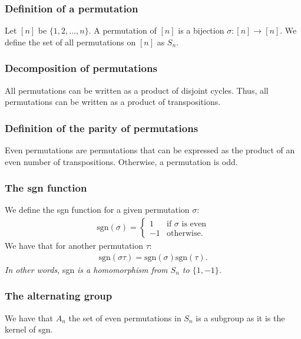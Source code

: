 \documentclass[a4paper, 12pt, twoside]{article}
\begin{document}
\subsubsection{Definition of a permutation}

Let $[n]$ be $\{1, 2, \ldots, n\}$. A permutation of $[n]$ is a bijection
$\sigma : [n] \to [n]$. We define the set of all permutations on $[n]$ as
$S_n$.

\subsubsection{Decomposition of permutations}

All permutations can be written as a product of disjoint cycles. Thus,
all permutations can be written as a product of transpositions.

\subsubsection{Definition of the parity of permutations}

Even permutations are permutations that can be expressed as the
product of an even number of transpositions. Otherwise, a
permutation is odd. 

\subsubsection{The sgn function}

We define the sgn function for a given
permutation $\sigma$: \begin{gather*}
  \text{sgn}(\sigma) = \begin{cases}
    1 & \text{if } \sigma \text{ is even} \\
    -1 & \text{otherwise.}
  \end{cases}
\end{gather*} We have that for another permutation $\tau$: \begin{gather*}
  \text{sgn}(\sigma\tau) = \text{sgn}(\sigma)\text{sgn}(\tau).
\end{gather*} \textit{In other words,} sgn \textit{is a 
homomorphism from $S_n$ to $\{1, -1\}$.}

\subsubsection{The alternating group}

We have that $A_n$ the set of even permutations in $S_n$ is a
subgroup as it is the kernel of sgn.
\end{document}
